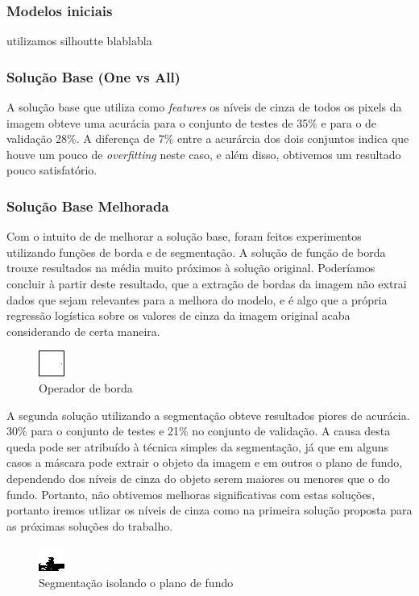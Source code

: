\documentclass[conference]{IEEEtran}
\begin{document}
\subsubsection{Modelos iniciais}
utilizamos silhoutte blablabla

\subsubsection{Solução Base (One vs All)}
A solução base que utiliza como \textit{features} os níveis de cinza de todos os pixels da imagem obteve uma acurácia para o conjunto de testes de 35\% e para o de validação 28\%. A diferença de 7\% entre a acurárcia dos dois conjuntos indica que houve um pouco de \textit{overfitting} neste caso, e além disso, obtivemos um resultado pouco satisfatório.

\subsubsection{Solução Base Melhorada}
Com o intuito de de melhorar a solução base, foram feitos experimentos utilizando funções de borda e de segmentação. A solução de função de borda trouxe resultados na média muito próximos à solução original. Poderíamos concluir à partir deste resultado, que a extração de bordas da imagem não extrai dados que sejam relevantes para a melhora do modelo, e é algo que a própria regressão logística sobre os valores de cinza da imagem original acaba considerando de certa maneira.

\begin{figure}[H]
  \includegraphics[center]{bor.png}
  \caption{Operador de borda}
  \label{fig:frog1}
\end{figure}

A segunda solução utilizando a segmentação obteve resultados piores de acurácia. 30\% para o conjunto de testes e 21\% no conjunto de validação. A causa desta queda pode ser atribuído à técnica simples da segmentação, já que em alguns casos a máscara pode extrair o objeto da imagem e em outros o plano de fundo, dependendo dos níveis de cinza do objeto serem maiores ou menores que o do fundo. Portanto, não obtivemos melhoras significativas com estas soluções, portanto iremos utlizar os níveis de cinza como na primeira solução proposta para as próximas soluções do trabalho.

\begin{figure}[H]
  \includegraphics[center]{seg1.png}
  \caption{Segmentação isolando o plano de fundo}
  \label{fig:boat1}
\end{figure}
\end{document}
